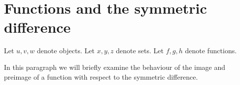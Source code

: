 \documentclass[../../set-theory.tex]{subfiles}
\begin{document}
  \section{Functions and the symmetric difference}

  \begin{forthel}
  \end{forthel}

  \begin{forthel}
  \end{forthel}

  \begin{forthel}
    Let $u,v,w$ denote objects.
    Let $x,y,z$ denote sets.
    Let $f,g,h$ denote functions.
  \end{forthel}

  \noindent In this paragraph we will briefly examine the behaviour of the
  image and preimage of a function with respect to the symmetric difference.
\end{document}
